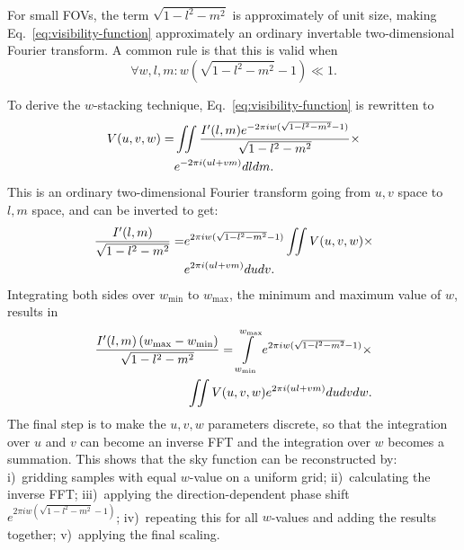 \documentclass[useAMS,usenatbib]{mn2e}
\begin{document}
For small FOVs, the term $\sqrt{1-l^2-m^2}$ is approximately of unit size, making Eq.~\eqref{eq:visibility-function} approximately an ordinary invertable two-dimensional Fourier transform. A common rule is that this is valid when
\begin{equation}\label{eq:when-2d-is-valid}
\forall w,l,m: w\left(\sqrt{1-l^2-m^2}-1\right) \ll 1.
\end{equation}

To derive the $w$-stacking technique, Eq.~\eqref{eq:visibility-function} is rewritten to
\begin{align}\notag
V(u,v,w) = & \iint \frac{I'(l,m) e^{-2\pi i w(\sqrt{1-l^2-m^2}-1)}}{\sqrt{1-l^2-m^2}} \times \\ \notag
& e^{-2\pi i \left(ul + vm\right)} dl dm.
\end{align}
This is an ordinary two-dimensional Fourier transform going from $u,v$ space to $l,m$ space, and can be inverted to get:
\begin{align}\notag
\frac{I'(l,m)}{\sqrt{1-l^2-m^2}} = & e^{2\pi i w(\sqrt{1-l^2-m^2}-1)} \iint V(u,v,w) \times \\ \notag
& e^{2\pi i \left(ul + vm\right)} du dv.
\end{align}
Integrating both sides over $w_{\min}$ to $w_{\max}$, the minimum and maximum value of $w$, results in
\begin{align}\notag
\frac{I'(l,m)\left(w_{\max} - w_{\min}\right)}{\sqrt{1-l^2-m^2}} = \int\limits_{w_{\min}}^{w_{\max}} e^{2\pi i w(\sqrt{1-l^2-m^2}-1)} \times \\ \label{eq:wstacking}
\iint V(u,v,w)  e^{2\pi i \left(ul + vm\right)} du dv dw.
\end{align}
The final step is to make the $u,v,w$ parameters discrete, so that the integration over $u$ and $v$ can become an inverse FFT and the integration over $w$ becomes a summation. This shows that the sky function can be reconstructed by: i)~gridding samples with equal $w$-value on a uniform grid; ii)~calculating the inverse FFT; iii)~applying the direction-dependent phase shift $e^{2\pi i w(\sqrt{1-l^2-m^2}-1)}$; iv)~repeating this for all $w$-values and adding the results together; v)~applying the final scaling.
\end{document}
